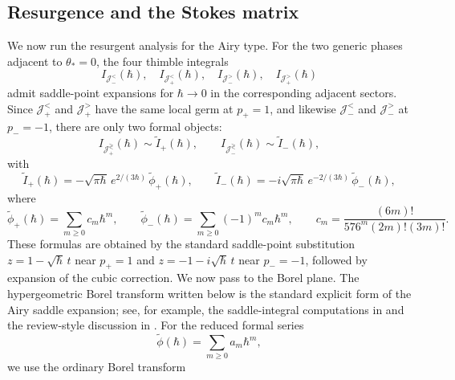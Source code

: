 \documentclass[11pt]{amsart}
\theoremstyle{plain}
\newcommand{\J}{\mathcal J}
\begin{document}
\smallskip
\subsection{Resurgence and the Stokes matrix}
We now run the resurgent analysis for the Airy type. For the two generic phases adjacent to \(\theta_*=0\), the four thimble integrals
\begin{equation*}
I_{\J_-^{<}}(\hbar),\quad I_{\J_+^{<}}(\hbar),\quad I_{\J_-^{>}}(\hbar),\quad I_{\J_+^{>}}(\hbar)
\end{equation*}
admit saddle-point expansions for \(\hbar\to0\) in the corresponding adjacent sectors. Since \(\J_+^{<}\) and \(\J_+^{>}\) have the same local germ at \(p_+=1\), and likewise \(\J_-^{<}\) and \(\J_-^{>}\) at \(p_-=-1\), there are only two formal objects:
\begin{equation*}
I_{\J_+^{{\gtrless}}}(\hbar)\sim\widetilde I_+(\hbar),\qquad
I_{\J_-^{{\gtrless}}}(\hbar)\sim \widetilde I_-(\hbar),
\end{equation*}
with
\begin{equation*}
\widetilde I_+(\hbar)=-\sqrt{\pi \hbar}\,e^{2/(3\hbar)}\,\widetilde\phi_+(\hbar),\qquad
\widetilde I_-(\hbar)=-i\sqrt{\pi \hbar}\,e^{-2/(3\hbar)}\,\widetilde\phi_-(\hbar),
\end{equation*}
where
\begin{equation*}
\widetilde\phi_+(\hbar)=\sum_{m\ge0}c_m\hbar^m,\qquad \widetilde\phi_-(\hbar)=\sum_{m\ge0}(-1)^m c_m\hbar^m,\qquad
c_m=\frac{(6m)!}{576^m(2m)!(3m)!}.
\end{equation*}
These formulas are obtained by the standard saddle-point substitution \(z=1-\sqrt{\hbar}\,t\) near \(p_+=1\) and \(z=-1-i\sqrt{\hbar}\,t\) near \(p_-=-1\), followed by expansion of the cubic correction. We now pass to the Borel plane. The hypergeometric Borel transform written below is the standard explicit form of the Airy saddle expansion; see, for example, the saddle-integral computations in \cite{CNP1993,DelabaerePham1999} and the review-style discussion in \cite{Dorigoni2014}. For the reduced formal series
\begin{equation*}\label{equ:ordinaryBorel}
\widetilde\phi(\hbar)=\sum_{m\ge0}a_m \hbar^m,
\end{equation*}
we use the ordinary Borel transform
\end{document}
